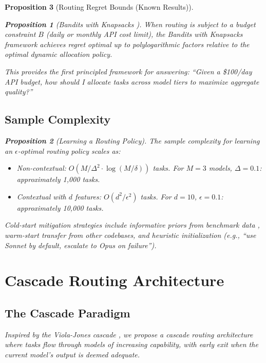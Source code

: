 \documentclass[11pt, a4paper, copyright]{googledeepmind}
\newtheorem{proposition}{Proposition}[section]
\begin{document}
\begin{proposition}[Routing Regret Bounds (Known Results)]
\begin{proposition}[Bandits with Knapsacks {\citep{badanidiyuru2018bwk}}]
\label{prop:bwk}
When routing is subject to a budget constraint $B$ (daily or monthly API cost limit), the Bandits with Knapsacks framework achieves regret optimal up to polylogarithmic factors relative to the optimal dynamic allocation policy.
\end{proposition}

This provides the first principled framework for answering: ``Given a \$100/day API budget, how should I allocate tasks across model tiers to maximize aggregate quality?''

\subsection{Sample Complexity}

\begin{proposition}[Learning a Routing Policy]
\label{prop:samplecomplexity}
The sample complexity for learning an $\epsilon$-optimal routing policy scales as:
\begin{itemize}
\item Non-contextual: $O(M / \Delta^2 \cdot \log(M / \delta))$ tasks. For $M = 3$ models, $\Delta = 0.1$: approximately 1,000 tasks.
\item Contextual with $d$ features: $O(d^2 / \epsilon^2)$ tasks. For $d = 10$, $\epsilon = 0.1$: approximately 10,000 tasks.
\end{itemize}
\end{proposition}

Cold-start mitigation strategies include informative priors from benchmark data \citep{agrawal2012thompson}, warm-start transfer from other codebases, and heuristic initialization (e.g., ``use Sonnet by default, escalate to Opus on failure'').


\section{Cascade Routing Architecture}
\label{sec:cascade}

\subsection{The Cascade Paradigm}

Inspired by the Viola-Jones cascade \citep{violajones2001, violajones2004}, we propose a cascade routing architecture where tasks flow through models of increasing capability, with early exit when the current model's output is deemed adequate.


\end{proposition}
\end{document}
